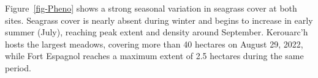 \documentclass[
  number]{elsarticle}
\begin{document}
Figure~\ref{fig-Pheno} shows a strong seasonal variation in seagrass
cover at both sites. Seagrass cover is nearly absent during winter and
begins to increase in early summer (July), reaching peak extent and
density around September. Kerouarc'h hosts the largest meadows, covering
more than 40 hectares on August 29, 2022, while Fort Espagnol reaches a
maximum extent of 2.5 hectares during the same period.



\end{document}
